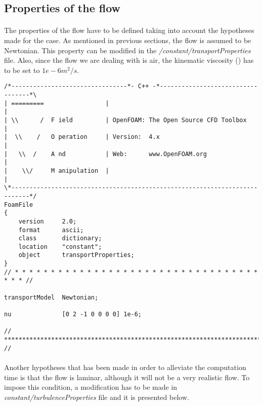 \subsection{Properties of the flow}

\paragraph{}The properties of the flow have to be defined taking into account the hypotheses made for the case. As mentioned in previous sections, the flow is assumed to be Newtonian. This property can be modified in the \textit{/constant/transportProperties} file. Also, since the flow we are dealing with is air, the kinematic viscosity (\nu) has to be set to $1e-6 m^2/s$.

\begin{footnotesize}
\begin{verbatim}
/*--------------------------------*- C++ -*----------------------------------*\
| =========                 |                                                 |
| \\      /  F ield         | OpenFOAM: The Open Source CFD Toolbox           |
|  \\    /   O peration     | Version:  4.x                                   |
|   \\  /    A nd           | Web:      www.OpenFOAM.org                      |
|    \\/     M anipulation  |                                                 |
\*---------------------------------------------------------------------------*/
FoamFile
{
    version     2.0;
    format      ascii;
    class       dictionary;
    location    "constant";
    object      transportProperties;
}
// * * * * * * * * * * * * * * * * * * * * * * * * * * * * * * * * * * * * * //

transportModel  Newtonian;

nu              [0 2 -1 0 0 0 0] 1e-6;

// ************************************************************************* //
\end{verbatim}
\end{footnotesize}

\paragraph{}Another hypotheses that has been made in order to alleviate the computation time is that the flow is laminar, although it will not be a very realistic flow. To impose this condition, a modification has to be made in \textit{constant/turbulenceProperties} file and it is presented below.



